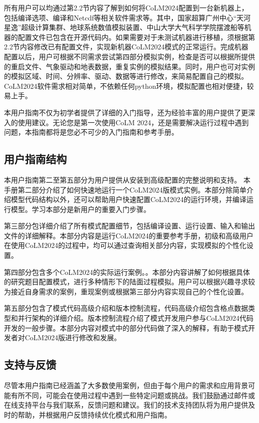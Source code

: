 \documentclass[a4paper,12pt,twoside]{article}
\begin{document}
所有用户可以均通过第2.2节内容了解到如何将CoLM2024配置到一台新机器上，包括编译选项、编译和Netcdf等相关软件需求等。其中，国家超算广州中心“天河星逸”超级计算集群、地球系统数值模拟装置、中山大学大气科学学院摆渡船等机器的配置文件已包含在开源代码内。如果需要对于未测试机器进行移植，须根据第2.2节内容修改已有配置文件，实现新机器CoLM2024模式的正常运行。完成机器配置以后，用户可根据不同需求尝试第四部分模拟实例，检查是否可以根据所提供的重启文件、气象驱动和地表数据，重复实例的模拟结果。同时，用户也可对实例的模拟区域、时间、分辨率、驱动、数据等进行修改，来简易配置自己的模拟。CoLM2024软件需求相对简单，不依赖任何python环境，模拟配置也相对便捷，较易上手。

本用户指南不仅为初学者提供了详细的入门指导，还为经验丰富的用户提供了更深入的使用建议。无论您是第一次使用CoLM 2024，还是需要解决运行过程中遇到问题，本指南都将是您必不可少的入门指南和参考手册。

\subsection{用户指南结构}

本用户指南第二至第五部分为用户提供从安装到高级配置的完整说明和支持。
本手册第二部分介绍了如何快速地运行一个CoLM2024版模式实例。本部分除简单介绍模型代码结构以外，还可以帮助用户快速配置CoLM2024的运行环境，并编译运行模型。学习本部分是新用户的重要入门步骤。

第三部分包详细介绍了所有模式配置细节，包括编译设置、运行设置、输入和输出文件的详细解释。本部分内容是运行CoLM2024的重要参考手册，初级和高级用户在使用CoLM2024的过程中，均可以通过查询相关部分内容，实现模拟的个性化设置。

第四部分包含多个CoLM2024的实际运行案例。。本部分内容讲解了如何根据具体的研究题目配置模式，进行多种情形下的陆面过程模拟。用户可以根据兴趣寻求较为接近自身需求的案例，重现案例或根据第三部分内容实现自己的个性化设置。

第五部分包含了模式代码高级介绍和版本控制流程，代码高级介绍包含格点数据类型和并行架构的详细介绍。版本控制流程介绍了模式开发用户参与CoLM2024代码开发的一般步骤。本部分内容对模式中的部分代码做了深入的解释，有助于模式开发者对CoLM2024版进行修改和发展。

\subsection{支持与反馈}

尽管本用户指南已经涵盖了大多数使用案例，但由于每个用户的需求和应用背景可能有所不同，可能会在使用过程中遇到一些特定问题或挑战。我们鼓励通过邮件或在线支持平台与我们联系，反馈问题和建议。我们的技术支持团队将为用户提供及时的帮助，并根据用户反馈持续优化模式和用户指南。
\end{document}
